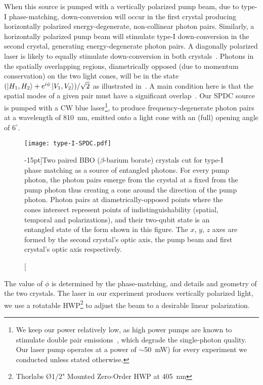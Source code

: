 \bigskip
\noindent
When this source is pumped with a vertically polarized pump beam, due to type-I phase-matching, down-conversion will occur in the first crystal producing  horizontally polarized energy-degenerate, non-collinear photon pairs. Similarly, a horizontally polarized pump beam will stimulate type-I down-conversion in the second crystal, generating energy-degenerate photon pairs. A diagonally polarized laser is likely to equally stimulate down-conversion in both crystals~\cite{Kwiat_1999}. Photons in the spatially overlapping regions, diametrically opposed (due to momentum conservation) on the two light cones, will be in the state $(\ket{H_1,H_2} + e^{i\phi}\ket{V_1,V_2})/\sqrt{2}$ as illustrated in~. A main condition here is that the spatial modes of a given pair must have a significant overlap~\cite{Kwiat_1999}. Our \acs{SPDC} source is pumped with a \gls{CW} blue laser\footnote[][-55pt]{We keep our power relatively low, as high power pumps are known to stimulate double pair emissions~\cite{Weinfurter_2001,Fulconis_2007}, which degrade the single-photon quality. Our laser pump operates at a power of $\sim$\SI{50}{\milli\watt}) for every experiment we conducted unless stated otherwise.}, to produce frequency-degenerate photon pairs at a wavelength of \SI{810}{\nano\meter}, emitted onto a light cone with an (full) opening angle of $6^{\circ}$. 

\clearpage
\begin{figure}[h]
	\centering
	\texttt{[image: type-I-SPDC.pdf]}
	\caption[Two paired \acs{BBO} ($\beta$-barium borate) crystals cut for type-I phase matching.][-15pt]{Two paired \acs{BBO} ($\beta$-barium borate) crystals cut for type-I phase matching as a source of entangled photons. For every pump photon, the photon pairs emerge from the crystal at a fixed from the pump photon thus creating a cone around the direction of the pump photon. Photon pairs at diametrically-opposed points where the cones intersect represent points of indistinguishability (spatial, temporal and polarizations), and their two-qubit state is an entangled state of the form shown in this figure. The $x$, $y$, $z$ axes are formed by the second crystal's optic axis, the pump beam and first crystal's optic axis respectively.}
\end{figure}
\noindent
The value of $\phi$ is determined by the phase-matching, and details and geometry of the two crystals. The laser in our experiment produces vertically polarized light, we use a rotatable \acs{HWP}\footnote[][80pt]{Thorlabs Ø1/2" Mounted Zero-Order \acs{HWP} at \SI{405}{nm}} to adjust the beam to a desirable linear polarization.


